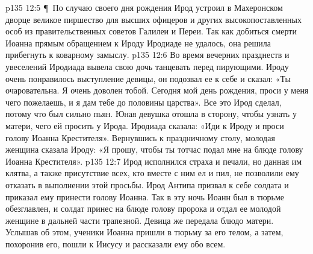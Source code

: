 \vs p135 12:5 \P\ По случаю своего дня рождения Ирод устроил в Махеронском дворце великое пиршество для высших офицеров и других высокопоставленных особ из правительственных советов Галилеи и Переи. Так как добиться смерти Иоанна прямым обращением к Ироду Иродиаде не удалось, она решила прибегнуть к коварному замыслу.
\vs p135 12:6 Во время вечерних празднеств и увеселений Иродиада вывела свою дочь танцевать перед пирующими. Ироду очень понравилось выступление девицы, он подозвал ее к себе и сказал: «Ты очаровательна. Я очень доволен тобой. Сегодня мой день рождения, проси у меня чего пожелаешь, и я дам тебе до половины царства». Все это Ирод сделал, потому что был сильно пьян. Юная девушка отошла в сторону, чтобы узнать у матери, чего ей просить у Ирода. Иродиада сказала: «Иди к Ироду и проси голову Иоанна Крестителя». Вернувшись к праздничному столу, молодая женщина сказала Ироду: «Я прошу, чтобы ты тотчас подал мне на блюде голову Иоанна Крестителя».
\vs p135 12:7 Ирод исполнился страха и печали, но данная им клятва, а также присутствие всех, кто вместе с ним ел и пил, не позволили ему отказать в выполнении этой просьбы. Ирод Антипа призвал к себе солдата и приказал ему принести голову Иоанна. Так в эту ночь Иоанн был в тюрьме обезглавлен, и солдат принес на блюде голову пророка и отдал ее молодой женщине в дальней части трапезной. Девица же передала блюдо матери. Услышав об этом, ученики Иоанна пришли в тюрьму за его телом, а затем, похоронив его, пошли к Иисусу и рассказали ему обо всем.
